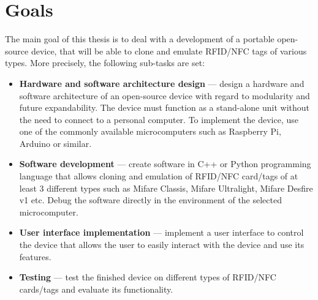 \chapter{Goals}
\label{chap:goals}

The main goal of this thesis is to deal with a development of a portable open-source device, that will be able to clone and emulate RFID/NFC tags of various types. More precisely, the following sub-tasks are set:

\begin{itemize}

    \item \textbf{Hardware and software architecture design} --- design a hardware and software architecture of an open-source device with regard to modularity and future expandability. The device must function as a stand-alone unit without the need to connect to a personal computer. To implement the device, use one of the commonly available microcomputers such as Raspberry Pi, Arduino or similar.

    \item \textbf{Software development} --- create software in C++ or Python programming language that allows cloning and emulation of RFID/NFC card/tags of at least 3 different types such as Mifare Classis, Mifare Ultralight, Mifare Desfire v1 etc. Debug the software directly in the environment of the selected microcomputer.

    \item \textbf{User interface implementation} --- implement a user interface to control the device that allows the user to easily interact with the device and use its features.

    \item \textbf{Testing} --- test the finished device on different types of RFID/NFC cards/tags and evaluate its functionality.

\end{itemize}